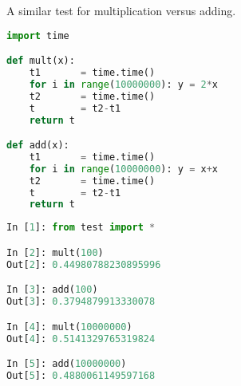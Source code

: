\documentclass[crop=false,class=book]{standalone}
\begin{document}
A similar test for multiplication versus adding.\newline
\begin{minipage}[t]{.48\textwidth}
\centering
\begin{lstlisting}[language=python,frame=single,basicstyle=\footnotesize,caption=Contents of test.py]
import time

def mult(x):
    t1       = time.time()
    for i in range(10000000): y = 2*x
    t2       = time.time()
    t        = t2-t1
    return t

def add(x):
    t1       = time.time()
    for i in range(10000000): y = x+x
    t2       = time.time()
    t        = t2-t1
    return t
\end{lstlisting}
\end{minipage}\hfill
\begin{minipage}[t]{.48\textwidth}
\centering
\begin{lstlisting}[language=python,frame=single,basicstyle=\footnotesize,caption=Inside iPython]
In [1]: from test import *

In [2]: mult(100)
Out[2]: 0.44980788230895996

In [3]: add(100)
Out[3]: 0.3794879913330078

In [4]: mult(10000000)
Out[4]: 0.5141329765319824

In [5]: add(10000000)
Out[5]: 0.4880061149597168
\end{lstlisting}
\end{minipage}
\end{document}
